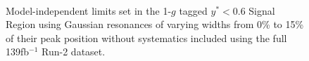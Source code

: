 \begin{figure}[!htb]
{            }\\
            \caption{Model-independent limits set in the 1-$g$ tagged $y^{*} < 0.6$ Signal Region using Gaussian resonances of varying widths from 0\% to 15\% of their peak position without systematics included using the full 139fb$^{-1}$ Run-2 dataset.}
            \label{fig:SignalIndependentGaussianLimits_1gYStar0p6}
        \end{figure}

